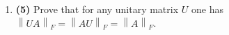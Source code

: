 \documentclass[prb,papersize=a4paper,notitlepage]{revtex4-2}%
\newcommand{\norm}[1]{\left\lVert#1\right\rVert}
\begin{document}
\begin{enumerate}
\item \textbf{(5)} Prove that for any unitary matrix $U$ one has $\norm{UA}_F=\norm{AU}_F=\norm{A}_F$.

\begin{comment}
\item \textbf{(5)} In this exercise, you are expected to use vectorized NumPy operations as much as possible.
     \begin{itemize}
         \item Generate a random matrix:
\lstset{language=Python}
\lstset{frame=lines}
\lstset{label={lst:code_direct}}
\lstset{basicstyle=\ttfamily}
\begin{lstlisting}
n = 100
A = np.random.normal(size=(n, n))
\end{lstlisting}
\item Plot the distribution function of the angles $\angle (a_i, a_j)$ where $a_i$ are columns of the matrix $a$ and $i\ne j$. How does the standard deviation of this distribution decay with $n$ (check this empirically)?
\item Construct the matrix $a^\prime$ with column vectors obtained by normalizing the columns of $a$.
\end{itemize}
\end{comment}

\begin{comment}
\item \textbf{(5)} Implement the function \lstinline{sum_array(A)} which takes a 2D numpy array \lstinline{A} as input and returns the sum of the array's elements. Consider doing it in 3 ways: (i) looping through the array explicitely, (ii) doing the jit version of (i), and (iii) using NumPy's built-in functionality. Time these three approaches for large enough arrays.
\end{comment}


\end{enumerate}
\end{document}
